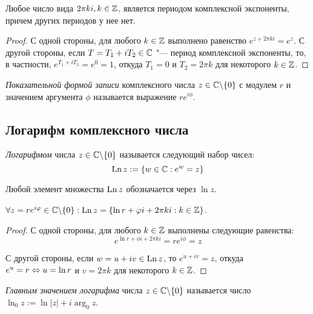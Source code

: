 \begin{proposition}
	Любое число вида $2\pi k i, k \in \mathbb{Z}$, является периодом комплексной экспоненты, причем других периодов у нее нет.
\end{proposition}

\begin{proof}
	С одной стороны, для любого $k \in \mathbb{Z}$ выполнено равенство $e^{z + 2\pi ki} = e^z$. С другой стороны, если $T = T_1 + iT_2 \in \mathbb{C}$ "--- период комплексной экспоненты, то, в частности, $e^{T_1 + iT_2} = e^0 = 1$, откуда $T_1 = 0$ и $T_2 = 2\pi k$ для некоторого $k \in \mathbb{Z}$.
\end{proof}

\begin{definition}
	\textit{Показательной формой записи} комплексного числа $z \in \mathbb{C} \backslash \{0\}$ с модулем $r$ и значением аргумента $\phi$ называется выражение $re^{i\phi}$.
\end{definition}

\subsection{Логарифм комплексного числа}

\begin{definition}
	\textit{Логарифмом} числа $z \in \mathbb{C} \backslash \{0\}$ называется следующий набор чисел:
	\[\operatorname{Ln}{z} := \left\{w \in \mathbb{C} : e^w = z\right\}\]
	
	Любой элемент множества $\operatorname{Ln}{z}$ обозначается через $\ln{z}$.
\end{definition}

\begin{proposition}
	$\forall z = re^{i\varphi} \in \mathbb{C} \backslash \{0\} : \operatorname{Ln}{z} = \{ \ln{r} + \varphi i + 2\pi ki : k \in \mathbb{Z}\}$.
\end{proposition}

\begin{proof}
	С одной стороны, для любого $k \in \mathbb{Z}$ выполнены следующие равенства: \[e^{\ln{r} + \phi i + 2\pi k i} = re^{i\phi} = z\]
	
	С другой стороны, если $w = u + iv \in \operatorname{Ln}{z}$, то $e^{u + iv} = z$, откуда $e^u = r \Leftrightarrow u = \ln{r}$ и $v = 2\pi k$ для некоторого $k \in \mathbb{Z}$.
\end{proof}

\begin{definition}
	\textit{Главным значением логарифма} числа $z \in \mathbb{C} \backslash \{0\}$ называется число $\ln_0{z} := \ln|z| + i\arg_0{z}$.
\end{definition}

